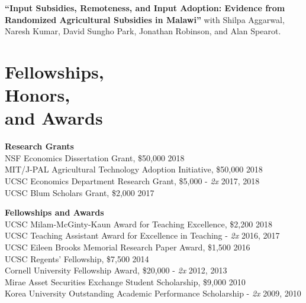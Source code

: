 \documentclass[letterpaper, margin, 10pt]{res} %
\begin{document}
\begin{resume}
 {\bf ``{Input Subsidies, Remoteness, and Input Adoption: Evidence from Randomized Agricultural Subsidies in Malawi}''}
 with Shilpa Aggarwal, Naresh Kumar, David Sungho Park, Jonathan Robinson, and Alan Spearot.
 





\section{\sc \textbf{Fellowships, \\ Honors, \\ and Awards}}
{\bf Research Grants}\\
NSF Economics Dissertation Grant, \$50,000  \hfill{2018}\\
MIT/J-PAL Agricultural Technology Adoption Initiative, \$50,000   \hfill{2018}\\
UCSC Economics Department Research Grant, \$5,000 - \textit{2x}  \hfill{2017, 2018}\\
UCSC Blum Scholars Grant, \$2,000    \hfill{2017}

{\bf Fellowships and Awards}\\
UCSC Milam-McGinty-Kaun Award for Teaching Excellence, \$2,200  \hfill{2018}\\
UCSC Teaching Assistant Award for Excellence in Teaching -  \textit{2x}   \hfill{2016, 2017}\\
UCSC Eileen Brooks Memorial Research Paper Award, \$1,500  \hfill{2016}\\
UCSC Regents' Fellowship, \$7,500 \hfill{2014}\\
Cornell University Fellowship Award, \$20,000 -  \textit{2x} \hfill{2012, 2013}\\
Mirae Asset Securities Exchange Student Scholarship, \$9,000 \hfill{2010}\\
Korea University Outstanding Academic Performance Scholarship -  \textit{2x} \hfill{2009, 2010}



\end{resume}
\end{document}
